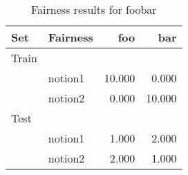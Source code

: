 \begin{table}[ht]
  \centering
  \caption{Fairness results for foobar }%
  \label{tab:foobar-fairness}
  \begin{tabular}{llrr}
    \toprule
    Set & Fairness & foo & bar \\
    \midrule
      Train\\
      & notion1
      & 10.000
      & 0.000
      \\
      & notion2
      & 0.000
      & 10.000
      \\
    \addlinespace
      Test\\
      & notion1
      & 1.000
      & 2.000
      \\
      & notion2
      & 2.000
      & 1.000
      \\
    
    \bottomrule
  \end{tabular}
\end{table}

